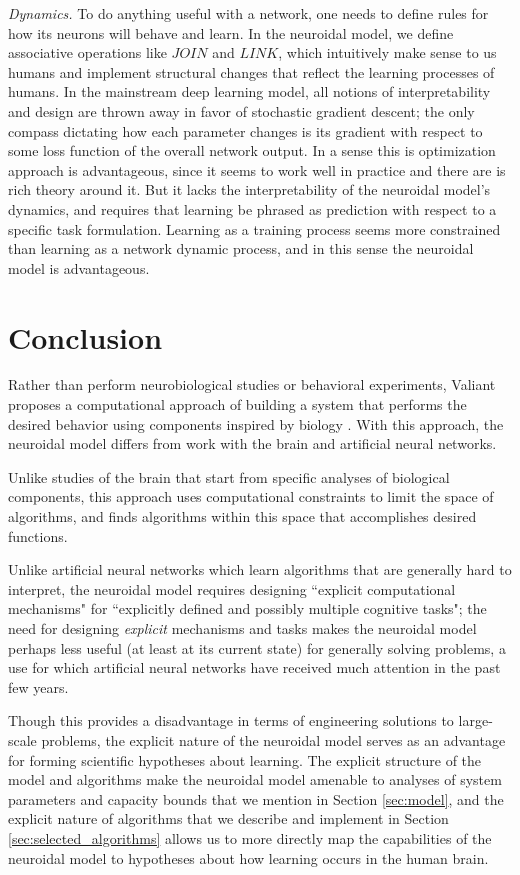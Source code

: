 \documentclass[letterpaper, 12pt]{article}
\begin{document}
{\it Dynamics.} To do anything useful with a network, one needs to define rules for how its neurons will behave and learn. In the neuroidal model, we define associative operations like $JOIN$ and $LINK$, which intuitively make sense to us humans and implement structural changes that reflect the learning processes of humans. In the mainstream deep learning model, all notions of interpretability and design are thrown away in favor of stochastic gradient descent; the only compass dictating how each parameter changes is its gradient with respect to some loss function of the overall network output. In a sense this is optimization approach is advantageous, since it seems to work well in practice and there are is rich theory around it. But it lacks the interpretability of the neuroidal model's dynamics, and requires that learning be phrased as prediction with respect to a specific task formulation. Learning as a training process seems more constrained than learning as a network dynamic process, and in this sense the neuroidal model is advantageous.

\section{Conclusion}
Rather than perform neurobiological studies or behavioral experiments, Valiant proposes a computational approach of building a system that performs the desired behavior using components inspired by biology \cite{valiant_circuits_1994}. With this approach, the neuroidal model differs from work with the brain and artificial neural networks.

Unlike studies of the brain that start from specific analyses of biological components, this approach uses computational constraints to limit the space of algorithms, and finds algorithms within this space that accomplishes desired functions.

Unlike artificial neural networks which learn algorithms that are generally hard to interpret, the neuroidal model requires designing ``explicit computational mechanisms" for ``explicitly defined and possibly multiple cognitive tasks"; the need for designing \textit{explicit} mechanisms and tasks makes the neuroidal model perhaps less useful (at least at its current state) for generally solving problems, a use for which artificial neural networks have received much attention in the past few years.

Though this provides a disadvantage in terms of engineering solutions to large-scale problems, the explicit nature of the neuroidal model serves as an advantage for forming scientific hypotheses about learning. The explicit structure of the model and algorithms make the neuroidal model amenable to analyses of system parameters and capacity bounds that we mention in Section \ref{sec:model}, and the explicit nature of algorithms that we describe and implement in Section \ref{sec:selected_algorithms} allows us to more directly map the capabilities of the neuroidal model to hypotheses about how learning occurs in the human brain.



\end{document}
